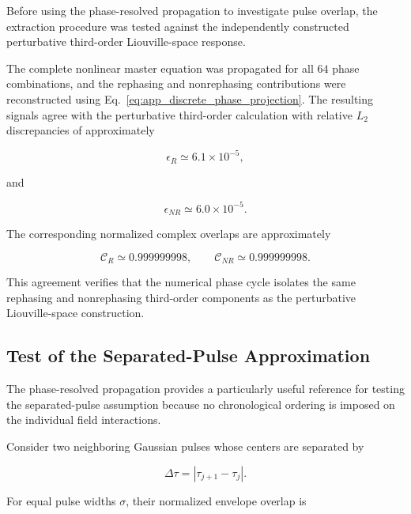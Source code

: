 \documentclass[11pt]{article}
\begin{document}
Before using the phase-resolved propagation to investigate pulse
overlap, the extraction procedure was tested against the independently
constructed perturbative third-order Liouville-space response.

The complete nonlinear master equation was propagated for all
$64$ phase combinations, and the rephasing and nonrephasing
contributions were reconstructed using
Eq.~\eqref{eq:app_discrete_phase_projection}.  The resulting signals
agree with the perturbative third-order calculation with relative
$L_2$ discrepancies of approximately

\begin{equation}
\epsilon_R
\simeq
6.1\times10^{-5},
\end{equation}

and

\begin{equation}
\epsilon_{NR}
\simeq
6.0\times10^{-5}.
\end{equation}

The corresponding normalized complex overlaps are approximately

\begin{equation}
\mathcal{C}_R
\simeq
0.999999998,
\qquad
\mathcal{C}_{NR}
\simeq
0.999999998.
\end{equation}

This agreement verifies that the numerical phase cycle isolates the
same rephasing and nonrephasing third-order components as the
perturbative Liouville-space construction.


\subsection{Test of the Separated-Pulse Approximation}
\label{app:ordering_validation}

The phase-resolved propagation provides a particularly useful reference
for testing the separated-pulse assumption because no chronological
ordering is imposed on the individual field interactions.

Consider two neighboring Gaussian pulses whose centers are separated
by

\begin{equation}
\Delta\tau
=
|\tau_{j+1}-\tau_j|.
\end{equation}

For equal pulse widths $\sigma$, their normalized envelope overlap is
\end{document}
